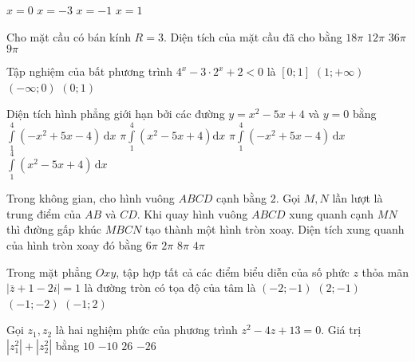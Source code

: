 \begin{ex}%
{
}
\choice
{$ x=0 $}
{$x=-3$}
{\True $x=-1$}
{$x=1$}
\end{ex}
\begin{ex}%
Cho mặt cầu có bán kính $ R=3 $. Diện tích của mặt cầu đã cho bằng
\choice
{$ 18\pi $}
{$12\pi$}
{\True $ 36\pi $}
{$ 9\pi $}

\end{ex}
\begin{ex}%
Tập nghiệm của bất phương trình $ 4^{x}-3\cdot 2^{x}+2<0 $ là
\choice
{\True $ [0; 1] $}
{$(1;+\infty)$}
{$ (-\infty; 0) $}
{$(0; 1)$}

\end{ex}
\begin{ex}%
Diện tích hình phẳng giới hạn bởi các đường $ y=x^2-5 x+4 $ và $ y=0 $ bằng
\choice
{\True $ \displaystyle\int\limits_1^4\left(-x^2+5 x-4\right)\mathrm{\,d}x $}
{$ \pi \displaystyle\int\limits_1^4\left(x^2-5 x+4\right) \mathrm{d} x $}
{$ \pi \displaystyle\int\limits_1^4\left(-x^2+5 x-4\right)\mathrm{\,d}x $}
{$ \displaystyle\int\limits_1^4\left(x^2-5 x+4\right)\mathrm{\,d}x $}

\end{ex}
\begin{ex}%
Trong không gian, cho hình vuông $ ABCD $ cạnh bằng $2$. Gọi $M, N$ lần lượt là trung điểm của $ AB $ và $ CD $. Khi quay hình vuông $ ABCD $ xung quanh cạnh $MN$ thì đường gấp khúc $ MBCN $ tạo thành một hình tròn xoay. Diện tích xung quanh của hình tròn xoay đó bằng
\choice
{$ 6\pi $}
{$ 2\pi $}
{$8\pi$}
{\True $4\pi$}

\end{ex}
\begin{ex}%
Trong mặt phẳng $ O x y $, tập hợp tất cả các điểm biểu diễn của số phức $z$ thỏa mãn$ |\bar{z}+1-2 i|=1 $ là đường tròn có tọa độ của tâm là
\choice
{$ (-2;-1) $}
{$(2;-1)$}
{\True $ (-1;-2) $}
{$(-1; 2)$}

\end{ex}
\begin{ex}%
Gọi $z_1, z_2$ là hai nghiệm phức của phương trình $ z^2-4 z+13=0 $. Giá trị $ \left|z_1^2\right|+\left|z_2^2\right| $ bằng
\choice
{$10$}
{$ -10 $}
{\True $26$}
{$ -26 $}

\end{ex}
